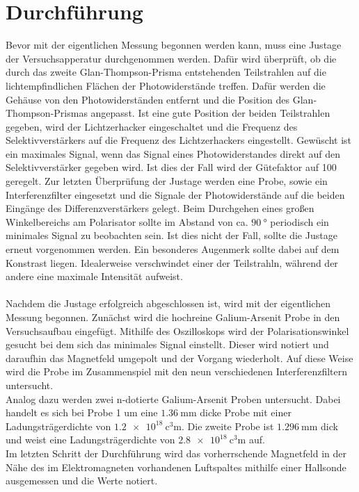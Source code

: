 \section{Durchführung}
Bevor mit der eigentlichen Messung begonnen werden kann, muss eine Justage der Versuchsapperatur durchgenommen 
werden. Dafür wird überprüft, ob die durch das zweite Glan-Thompson-Prisma entstehenden Teilstrahlen auf
die lichtempfindlichen Flächen der Photowiderstände treffen. Dafür werden die Gehäuse von den Photowiderständen
entfernt und die Position des Glan-Thompson-Prismas angepasst. Ist eine gute Position der beiden 
Teilstrahlen gegeben, wird der Lichtzerhacker eingeschaltet und die Frequenz des Selektivverstärkers auf
die Frequenz des Lichtzerhackers eingestellt. Gewüscht ist ein maximales Signal, wenn das Signal eines 
Photowiderstandes direkt auf den Selektivverstärker gegeben wird. Ist dies der Fall wird der 
Gütefaktor auf 100 geregelt. Zur letzten Überprüfung der Justage werden eine Probe, sowie ein
Interferenzfilter eingesetzt und die Signale der Photowiderstände auf die beiden Eingänge des 
Differenzverstärkers gelegt. Beim Durchgehen eines großen Winkelbereichs am Polarisator sollte im Abstand von ca. 
$\SI{90}{\degree}$ periodisch ein minimales Signal zu beobachten sein. Ist dies nicht der Fall, sollte 
die Justage erneut vorgenommen werden. Ein besonderes Augenmerk sollte dabei auf dem Konstrast liegen. 
Idealerweise verschwindet einer der Teilstrahln, während der andere eine maximale Intensität aufweist. \\
\\
Nachdem die Justage erfolgreich abgeschlossen ist, wird mit der eigentlichen Messung begonnen. Zunächst 
wird die hochreine Galium-Arsenit Probe in den Versuchsaufbau eingefügt. Mithilfe des Oszilloskops 
wird der Polarisationswinkel gesucht bei dem sich das minimales Signal einstellt. Dieser wird notiert und
daraufhin das Magnetfeld umgepolt und der Vorgang wiederholt. Auf diese Weise wird die Probe im Zusammenspiel
mit den neun verschiedenen Interferenzfiltern untersucht. \\
Analog dazu werden zwei n-dotierte Galium-Arsenit Proben untersucht. Dabei handelt es sich bei Probe 1 
um eine $\SI{1.36}{\milli\meter}$ dicke Probe mit einer Ladungsträgerdichte von
$\SI{1.2e18}{\cubic\centi\meter}$. Die zweite Probe ist $\SI{1.296}{\milli\meter}$ dick und weist eine 
Ladungsträgerdichte von $\SI{2,8e18}{\cubic\centi\meter}$ auf. \\
Im letzten Schritt der Durchführung wird das vorherrschende Magnetfeld in der Nähe des im Elektromagneten 
vorhandenen Luftspaltes mithilfe einer Hallsonde ausgemessen und die Werte notiert.